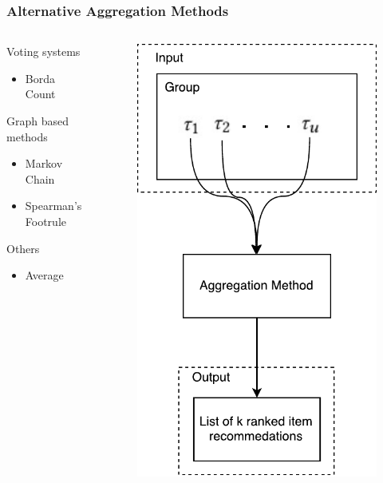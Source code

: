 \begin{frame}
\frametitle{Alternative Aggregation Methods}
	\begin{columns}
		\begin{column}{0.5\textwidth}
		Voting systems
\begin{itemize}
\item Borda Count
\end{itemize}
Graph based methods
\begin{itemize}
\item Markov Chain 
\item Spearman's Footrule
\end{itemize}
Others
\begin{itemize}
\item Average
\end{itemize}
		\end{column}
		\begin{column}{0.5\textwidth}
		\begin{figure}
		\centering
		\includegraphics[scale=.4]{graphics/setuptransposed}
		\end{figure}
		\end{column}
\end{columns}
\end{frame}

%
